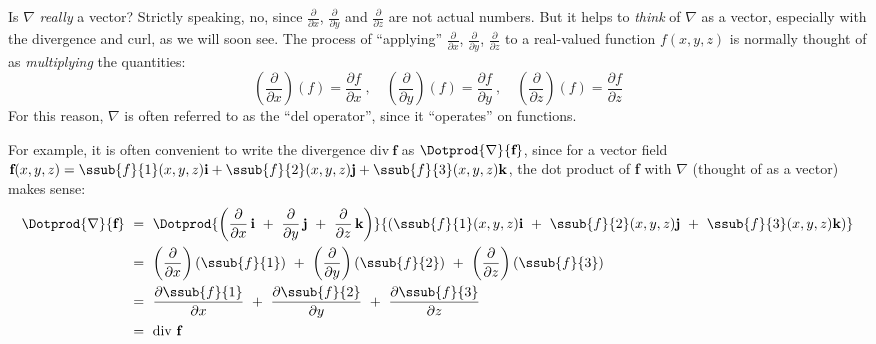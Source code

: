 Is $\nabla$ \emph{really} a vector? Strictly speaking, no, since $\frac{\partial}{\partial x}$,
$\frac{\partial}{\partial y}$ and $\frac{\partial}{\partial z}$ are not actual numbers. But it helps to
\emph{think} of $\nabla$ as a vector, especially with the divergence and curl, as we will soon see. The process of
``applying'' $\frac{\partial}{\partial x}$, $\frac{\partial}{\partial y}$, $\frac{\partial}{\partial z}$ to a
real-valued function $f(x,y,z)$ is normally thought of as \emph{multiplying} the quantities:
\begin{displaymath}
 \left( \frac{\partial}{\partial x} \right) (f) = \frac{\partial f}{\partial x} ~,\quad
 \left( \frac{\partial}{\partial y} \right) (f) = \frac{\partial f}{\partial y} ~,\quad
 \left( \frac{\partial}{\partial z} \right) (f) = \frac{\partial f}{\partial z}
\end{displaymath}
For this reason, $\nabla$ is often referred to as the ``del operator'', since it ``operates'' on functions.
 
For example, it is often convenient to write the divergence $\text{div}~\textbf{f}$ as $\Dotprod{\nabla}{\textbf{f}}$,
since for a vector field $\textbf{f}(x,y,z) =
\ssub{f}{1}(x,y,z)\textbf{i} + \ssub{f}{2}(x,y,z) \textbf{j} + \ssub{f}{3}(x,y,z) \textbf{k}$, the dot product of
\textbf{f} with $\nabla$ (thought of as a vector) makes sense:
\begin{align*}
 \Dotprod{\nabla}{\textbf{f}} ~&=~ \Dotprod{ \left( \frac{\partial}{\partial x}\,\textbf{i} ~+~
  \frac{\partial}{\partial y}\,\textbf{j} ~+~ \frac{\partial}{\partial z}\,\textbf{k} \right) }{\left( \ssub{f}{1}(x,y,z)
  \textbf{i} ~+~ \ssub{f}{2}(x,y,z) \textbf{j} ~+~ \ssub{f}{3}(x,y,z) \textbf{k} \right) }\\
   &=~ \left( \frac{\partial}{\partial x} \right) (\ssub{f}{1}) ~+~
    \left( \frac{\partial}{\partial y} \right) (\ssub{f}{2}) ~+~
    \left( \frac{\partial}{\partial z} \right) (\ssub{f}{3})\\
   &=~ \frac{\partial \ssub{f}{1}}{\partial x} ~+~ \frac{\partial \ssub{f}{2}}{\partial y} ~+~
  \frac{\partial \ssub{f}{3}}{\partial z}\\
   &=~ \text{div}~\textbf{f}
\end{align*}

